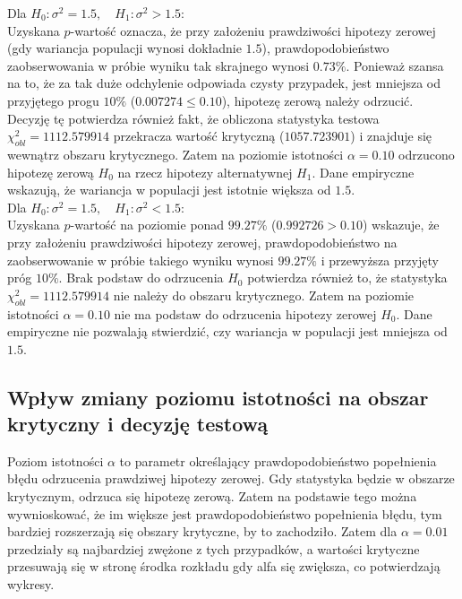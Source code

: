 \documentclass[12pt, a4paper]{article}
\begin{document}
	\noindent Dla $H_0 : \sigma^2 = 1.5, \quad H_1 : \sigma^2 > 1.5$: \\
			 Uzyskana $p$-wartość oznacza, że przy założeniu prawdziwości hipotezy zerowej (gdy wariancja populacji wynosi dokładnie $1.5$), prawdopodobieństwo zaobserwowania w próbie wyniku tak skrajnego wynosi $0.73\%$. Ponieważ szansa na to, że za tak duże odchylenie odpowiada czysty przypadek, jest mniejsza od przyjętego progu $10\%$ ($0.007274 \le 0.10$), hipotezę zerową należy odrzucić. Decyzję tę potwierdza również fakt, że obliczona statystyka testowa $\chi^2_{obl} = 1112.579914$ przekracza wartość krytyczną ($1057.723901$) i znajduje się wewnątrz obszaru krytycznego. Zatem na poziomie istotności $\alpha = 0.10$ odrzucono hipotezę zerową $H_0$ na rzecz hipotezy alternatywnej $H_1$. Dane empiryczne wskazują, że wariancja w populacji jest istotnie większa od $1.5$.\\
	
	\noindent Dla $H_0 : \sigma^2 = 1.5, \quad H_1 : \sigma^2 < 1.5$: \\
			Uzyskana $p$-wartość na poziomie ponad $99.27\%$ ($0.992726 > 0.10$) wskazuje, że przy założeniu prawdziwości hipotezy zerowej, prawdopodobieństwo na zaobserwowanie w próbie takiego wyniku wynosi $99.27\%$ i przewyższa przyjęty próg $10\%$. Brak podstaw do odrzucenia $H_0$ potwierdza również to, że statystyka $\chi^2_{obl} = 1112.579914$ nie należy do obszaru krytycznego. Zatem na poziomie istotności $\alpha = 0.10$ nie ma podstaw do odrzucenia hipotezy zerowej $H_0$. Dane empiryczne nie pozwalają stwierdzić, czy wariancja w populacji jest mniejsza od $1.5$.\\
	\subsection{Wpływ zmiany poziomu istotności na obszar krytyczny i decyzję testową}
		Poziom istotności $\alpha $ to parametr określający prawdopodobieństwo popełnienia błędu odrzucenia prawdziwej hipotezy zerowej. Gdy statystyka będzie w obszarze krytycznym, odrzuca się hipotezę zerową. Zatem na podstawie tego można wywnioskować, że im większe jest prawdopodobieństwo popełnienia błędu, tym bardziej rozszerzają się obszary krytyczne, by to zachodziło. Zatem dla $\alpha = 0.01 $ przedziały są najbardziej zwężone z tych przypadków, a wartości krytyczne przesuwają się w stronę środka rozkładu gdy alfa się zwiększa, co potwierdzają wykresy.
		
\end{document}
